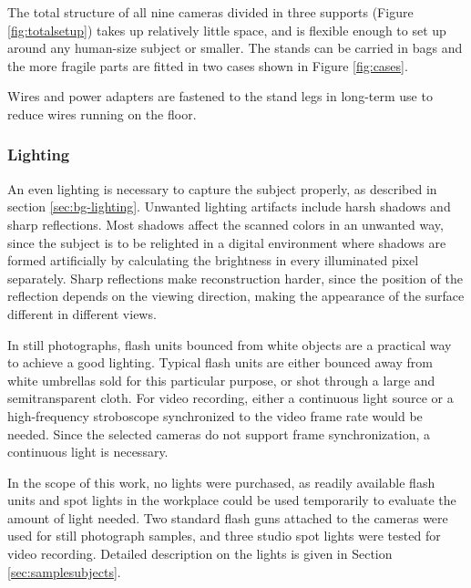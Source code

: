 The total structure of all nine cameras divided in three supports (Figure \ref{fig:totalsetup}) takes up relatively little space, and is flexible enough to set up around any human-size subject or smaller.
The stands can be carried in bags and the more fragile parts are fitted in two cases shown in Figure \ref{fig:cases}.

Wires and power adapters are fastened to the stand legs in long-term use to reduce wires running on the floor.




\subsubsection{Lighting}

An even lighting is necessary to capture the subject properly, as described in section \ref{sec:bg-lighting}.
Unwanted lighting artifacts include harsh shadows and sharp reflections.
Most shadows affect the scanned colors in an unwanted way, since the subject is to be relighted in a digital environment where shadows are formed artificially by calculating the brightness in every illuminated pixel separately.
Sharp reflections make reconstruction harder, since the position of the reflection depends on the viewing direction, making the appearance of the surface different in different views.

In still photographs, flash units bounced from white objects are a practical way to achieve a good lighting.
Typical flash units are either bounced away from white umbrellas sold for this particular purpose, or shot through a large and semitransparent cloth.
For video recording, either a continuous light source or a high-frequency stroboscope synchronized to the video frame rate would be needed.
Since the selected cameras do not support frame synchronization, a continuous light is necessary.

In the scope of this work, no lights were purchased, as readily available flash units and spot lights in the workplace could be used temporarily to evaluate the amount of light needed.
Two standard flash guns attached to the cameras were used for still photograph samples, and three studio spot lights were tested for video recording.
Detailed description on the lights is given in Section \ref{sec:samplesubjects}.

